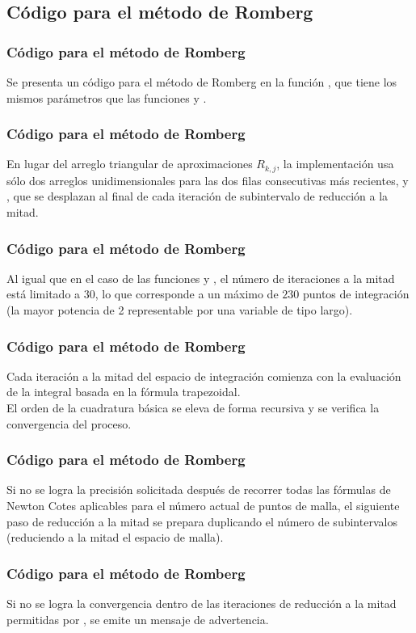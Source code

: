\subsection{Código para el método de Romberg}
\begin{frame}
\frametitle{Código para el método de Romberg}
Se presenta un código para el método de Romberg en la función , que tiene los mismos parámetros que las funciones  y .
\end{frame}
\begin{frame}
\frametitle{Código para el método de Romberg}
En lugar del arreglo triangular de aproximaciones $R_{k, j}$, la implementación usa sólo dos arreglos unidimensionales para las dos filas consecutivas más recientes,  y , que se desplazan al final de cada iteración de subintervalo de reducción a la mitad.
\end{frame}
\begin{frame}
\frametitle{Código para el método de Romberg}
Al igual que en el caso de las funciones  y , el número de iteraciones a la mitad está limitado a $30$, lo que corresponde a un máximo de $230$ puntos de integración (la mayor potencia de 2 representable por una variable de tipo largo).
\end{frame}
\begin{frame}
\frametitle{Código para el método de Romberg}
Cada iteración a la mitad del espacio de integración comienza con la evaluación de la integral basada en la fórmula trapezoidal.
\\
\bigskip
El orden de la cuadratura básica se eleva de forma recursiva y se verifica la convergencia del proceso.
\end{frame}
\begin{frame}
\frametitle{Código para el método de Romberg}
Si no se logra la precisión  solicitada después de recorrer todas las fórmulas de Newton Cotes aplicables para el número actual de puntos de malla, el siguiente paso de reducción a la mitad se prepara duplicando el número de subintervalos (reduciendo a la mitad el espacio de malla).
\end{frame}
\begin{frame}
\frametitle{Código para el método de Romberg}
Si no se logra la convergencia dentro de las iteraciones de reducción a la mitad permitidas por , se emite un mensaje de advertencia.
\end{frame}
